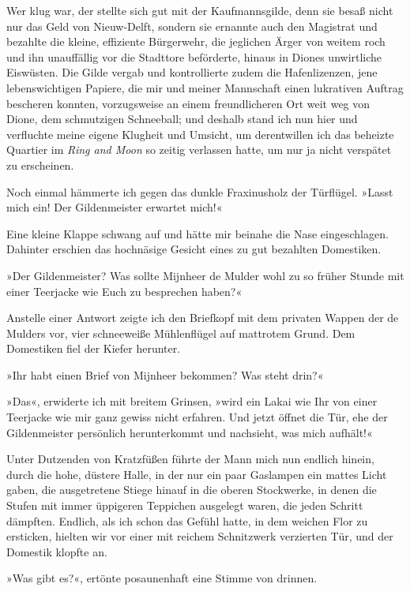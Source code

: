 Wer klug war, der stellte sich gut mit der Kaufmannsgilde, denn sie
besaß nicht nur das Geld von Nieuw-Delft, sondern sie ernannte auch
den Magistrat und bezahlte die kleine, effiziente Bürgerwehr, die
jeglichen Ärger von weitem roch und ihn unauffällig vor die
Stadttore beförderte, hinaus in Diones unwirtliche Eiswüsten. Die
Gilde vergab und kontrollierte zudem die Hafenlizenzen, jene
lebenswichtigen Papiere, die mir und meiner Mannschaft einen
lukrativen Auftrag bescheren konnten, vorzugsweise an einem
freundlicheren Ort weit weg von Dione, dem schmutzigen Schneeball;
und deshalb stand ich nun hier und verfluchte meine eigene Klugheit
und Umsicht, um derentwillen ich das beheizte Quartier im
\emph{Ring and Moon} so zeitig verlassen hatte, um nur ja nicht
verspätet zu erscheinen.

Noch einmal hämmerte ich gegen das dunkle Fraxinusholz der
Türflügel. »Lasst mich ein! Der Gildenmeister erwartet mich!«

Eine kleine Klappe schwang auf und hätte mir beinahe die Nase
eingeschlagen. Dahinter erschien das hochnäsige Gesicht eines zu
gut bezahlten Domestiken.

»Der Gildenmeister? Was sollte Mijnheer de Mulder wohl zu so früher
Stunde mit einer Teerjacke wie Euch zu besprechen haben?«

Anstelle einer Antwort zeigte ich den Briefkopf mit dem privaten
Wappen der de Mulders vor, vier schneeweiße Mühlenflügel auf
mattrotem Grund. Dem Domestiken fiel der Kiefer herunter.

»Ihr habt einen Brief von Mijnheer bekommen? Was steht drin?«

»Das«, erwiderte ich mit breitem Grinsen, »wird ein Lakai wie Ihr
von einer Teerjacke wie mir ganz gewiss nicht erfahren. Und jetzt
öffnet die Tür, ehe der Gildenmeister persönlich herunterkommt und
nachsieht, was mich aufhält!«

\bigpar

Unter Dutzenden von Kratzfüßen führte der Mann mich nun endlich
hinein, durch die hohe, düstere Halle, in der nur ein paar
Gaslampen ein mattes Licht gaben, die ausgetretene Stiege hinauf in
die oberen Stockwerke, in denen die Stufen mit immer üppigeren
Teppichen ausgelegt waren, die jeden Schritt dämpften. Endlich, als
ich schon das Gefühl hatte, in dem weichen Flor zu ersticken,
hielten wir vor einer mit reichem Schnitzwerk verzierten Tür, und
der Domestik klopfte an.

»Was gibt es?«, ertönte posaunenhaft eine Stimme von drinnen.


